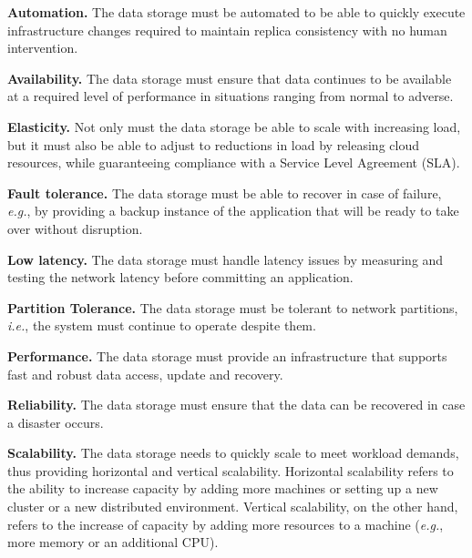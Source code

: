 \noindent
\textbf{Automation.} The data storage must be automated to be able to quickly execute infrastructure changes required to maintain replica consistency with no human intervention.

\noindent
\textbf{Availability.} The data storage must ensure that data continues to be available at a required level of performance in situations ranging from normal to adverse.

\noindent
\textbf{Elasticity.} Not only must the data storage be able to scale with increasing load, but it must also be able to adjust to reductions in load by releasing cloud resources, while guaranteeing compliance with a Service Level Agreement (SLA).

\noindent
\textbf{Fault tolerance.} The data storage must be able to recover in case of failure, \emph{e.g.}, by providing a backup instance of the application that will be ready to take over without disruption.

\noindent
\textbf{Low latency.} The data storage must handle latency issues by measuring and testing the network latency before committing an application. 

\noindent
{\al \textbf{Partition  Tolerance.}} The data storage must be tolerant to  network partitions, \emph{i.e.}, the system must continue to operate despite them. %

\noindent
\textbf{Performance.} The data storage must provide an infrastructure that supports fast and robust data access, update and recovery.

\noindent
\textbf{Reliability.} The data storage must ensure that the data can be recovered in case a disaster occurs.

\noindent
\textbf{Scalability.} The data storage needs to quickly scale to meet workload demands, thus providing horizontal and vertical scalability. Horizontal scalability  refers to the ability to increase capacity by adding more machines or setting up a new cluster or a new distributed environment. Vertical scalability, on the other hand, refers to the increase of capacity by adding more resources %
to a machine (\emph{e.g.}, more memory or an additional CPU).


